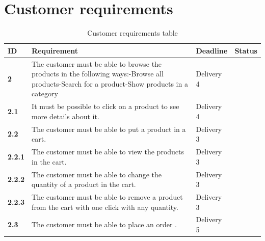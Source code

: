 \documentclass[a4paper,12pt]{article}
\begin{document}
\section{Customer requirements}
\begin{table}[htbp]
	\centering
	\caption{Customer requirements table}
	\label{my-label}
	\begin{tabular}{|l|L{8cm}|L{2.5cm}|L{2.5cm}|}
		\hline
		\textbf{ID}    & \textbf{Requirement}                                                                                                                                                                          & Deadline & Status \\ \hline
		\textbf{2}     & The customer must be able to browse the products in the following ways:\newline -Browse all products\newline -Search for a product\newline -Show products in a category &  Delivery 4       &        \\ \hline
		\textbf{2.1}   & It must be possible to click on a product to see more details about it.                                                                                                                       &    Delivery 4      &        \\ \hline
		\textbf{2.2}   & The customer must be able to put a product in a cart.                                                                                                                                         &   Delivery 3       &        \\ \hline
		\textbf{2.2.1} & The customer must be able to view the products in the cart.                                                                                                                                   &     Delivery 3    &        \\ \hline
		\textbf{2.2.2} & The customer must be able to change the quantity of a product in the cart.                                                                                                              &   Delivery 3       &        \\ \hline
		\textbf{2.2.3} & The customer must be able to remove a product from the cart with one click with any quantity.                                                     &     Delivery 3     &        \\ \hline
		\textbf{2.3}   & The customer must be able to place an order   .                                                                                                                                               &     Delivery 5     &        \\ \hline

\end{tabular}
\end{table}
\end{document}
